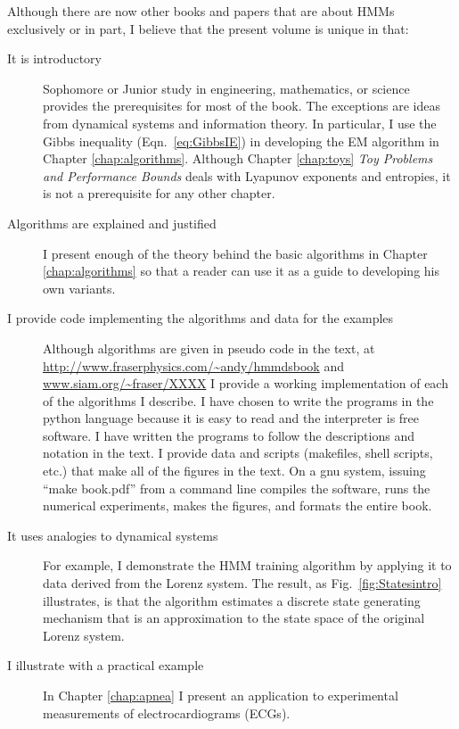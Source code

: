 \documentclass[ltxbook,showlabels]{hmmdsbook}
\begin{document}
Although there are now other books and papers that are about HMMs
exclusively or in part, I believe that the present volume is unique in
that:
\begin{description}
\item[It is introductory] Sophomore or Junior study in engineering,
  mathematics, or science provides the prerequisites for most of the
  book.  The exceptions are ideas from dynamical systems and
  information theory.  In particular, I use the Gibbs inequality
  (Eqn.~\eqref{eq:GibbsIE}) in developing the EM algorithm in Chapter
  \ref{chap:algorithms}.  Although Chapter \ref{chap:toys} \emph{Toy
    Problems and Performance Bounds} deals with Lyapunov exponents and
  entropies, it is not a prerequisite for any other chapter.
\item[Algorithms are explained and justified] I present enough of the
  theory behind the basic algorithms in Chapter \ref{chap:algorithms}
  so that a reader can use it as a guide to developing his own
  variants.
\item[I provide code implementing the algorithms and data for the
  examples] Although algorithms are given in pseudo code in the text,
  at \url{http://www.fraserphysics.com/~andy/hmmdsbook} and %
  \url{www.siam.org/~fraser/XXXX} I provide a working implementation
  of each of the algorithms I describe.  I have chosen to write the
  programs in the python language because it is easy to read and the
  interpreter is free software.  I have written the programs to follow
  the descriptions and notation in the text.  I provide data and
  scripts (makefiles, shell scripts, etc.)  that make all of the
  figures in the text.  On a gnu system, %
  issuing ``make book.pdf''
  from a command line compiles the software, runs the numerical
  experiments, makes the figures, and formats the entire book.
\item[It uses analogies to dynamical systems] For example, I
  demonstrate the HMM training algorithm by applying it to data
  derived from the Lorenz system.  The result, as
  Fig.~\ref{fig:Statesintro} illustrates, is that the algorithm
  estimates a discrete state generating mechanism that is an
  approximation to the state space of the original Lorenz system.
\item[I illustrate with a practical example] In Chapter \ref{chap:apnea} I
  present an application to experimental measurements of
  electrocardiograms (ECGs).
\end{description}
\end{document}
